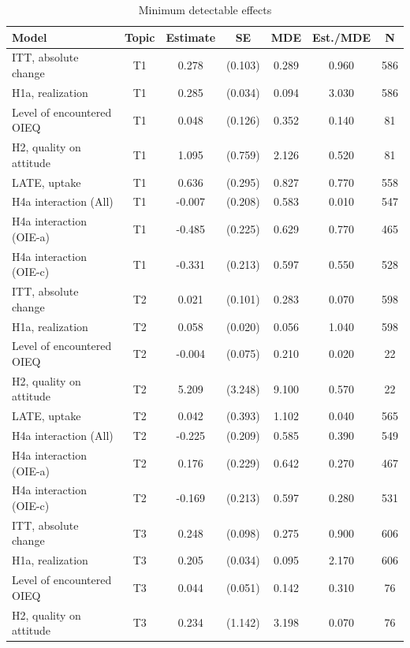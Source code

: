 \begin{table}[htbp]
\centering
\begin{threeparttable}
\caption{Minimum detectable effects}
\label{tab:tab_detection_limits}
\begin{tabular}{lcccccc}
\toprule
  Model & Topic & Estimate & SE & MDE & Est./MDE & N \\
\midrule
  ITT, absolute change & T1 & 0.278 & (0.103) & 0.289 & 0.960 & 586 \\
  H1a, realization & T1 & 0.285 & (0.034) & 0.094 & 3.030 & 586 \\
  Level of encountered OIEQ & T1 & 0.048 & (0.126) & 0.352 & 0.140 & 81 \\
  H2, quality on attitude & T1 & 1.095 & (0.759) & 2.126 & 0.520 & 81 \\
  LATE, uptake & T1 & 0.636 & (0.295) & 0.827 & 0.770 & 558 \\
  H4a interaction (All) & T1 & -0.007 & (0.208) & 0.583 & 0.010 & 547 \\
  H4a interaction (OIE-a) & T1 & -0.485 & (0.225) & 0.629 & 0.770 & 465 \\
  H4a interaction (OIE-c) & T1 & -0.331 & (0.213) & 0.597 & 0.550 & 528 \\
  ITT, absolute change & T2 & 0.021 & (0.101) & 0.283 & 0.070 & 598 \\
  H1a, realization & T2 & 0.058 & (0.020) & 0.056 & 1.040 & 598 \\
  Level of encountered OIEQ & T2 & -0.004 & (0.075) & 0.210 & 0.020 & 22 \\
  H2, quality on attitude & T2 & 5.209 & (3.248) & 9.100 & 0.570 & 22 \\
  LATE, uptake & T2 & 0.042 & (0.393) & 1.102 & 0.040 & 565 \\
  H4a interaction (All) & T2 & -0.225 & (0.209) & 0.585 & 0.390 & 549 \\
  H4a interaction (OIE-a) & T2 & 0.176 & (0.229) & 0.642 & 0.270 & 467 \\
  H4a interaction (OIE-c) & T2 & -0.169 & (0.213) & 0.597 & 0.280 & 531 \\
  ITT, absolute change & T3 & 0.248 & (0.098) & 0.275 & 0.900 & 606 \\
  H1a, realization & T3 & 0.205 & (0.034) & 0.095 & 2.170 & 606 \\
  Level of encountered OIEQ & T3 & 0.044 & (0.051) & 0.142 & 0.310 & 76 \\
  H2, quality on attitude & T3 & 0.234 & (1.142) & 3.198 & 0.070 & 76 \\

\end{tabular}
\end{threeparttable}
\end{table}
